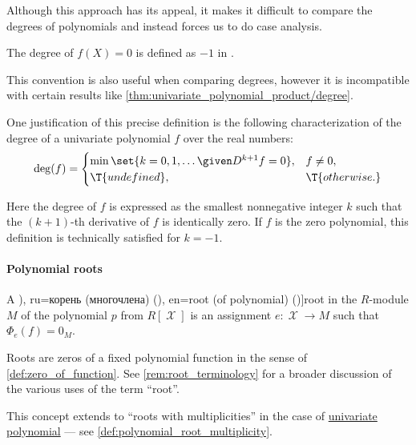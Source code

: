\begin{remark}
\begin{thmenum}
    Although this approach has its appeal, it makes it difficult to compare the degrees of polynomials and instead forces us to do case analysis.

     The degree of \( f(X) = 0 \) is defined as \( -1 \) in \cite[10]{FriedbergInselSpence2018LinearAlgebra}.

    This convention is also useful when comparing degrees, however it is incompatible with certain results like \cref{thm:univariate_polynomial_product/degree}.

    One justification of this precise definition is the following characterization of the degree of a univariate polynomial \( f \) over the real numbers:
    \begin{equation*}
      \deg(f) = \begin{cases}
        \min\set{ k = 0, 1, \ldots \given D^{k+1} f = 0 }, &f \neq 0, \\
        \T{undefined},                                     &\T{otherwise.}
      \end{cases}
    \end{equation*}

    Here the degree of \( f \) is expressed as the smallest nonnegative integer \( k \) such that the \( (k + 1) \)-th derivative of \( f \) is identically zero. If \( f \) is the zero polynomial, this definition is technically satisfied for \( k = -1 \).
  \end{thmenum}
\end{remark}

\paragraph{Polynomial roots}

\begin{definition}\label{def:polynomial_root}\mimprovised
  A \term[bg=корен (на уравнение) (\cite[2]{Обрешков1962ВисшаАлгебра}), ru=корень (многочлена) (\cite[99]{Винберг2014КурсАлгебры}), en=root (of polynomial) (\cite[281]{Aluffi2009Algebra})]{root} in the \( R \)-module \( M \) of the polynomial \( p \) from \( R[\mscrX] \) is an assignment \( e: \mscrX \to M \) such that \( \Phi_e(f) = 0_M \).
\end{definition}
\begin{comments}
  \item Roots are zeros of a fixed polynomial function in the sense of \cref{def:zero_of_function}. See \cref{rem:root_terminology} for a broader discussion of the various uses of the term \enquote{root}.

  \item This concept extends to \enquote{roots with multiplicities} in the case of \hyperref[def:univariate_polynomial]{univariate polynomial} --- see \cref{def:polynomial_root_multiplicity}.
\end{comments}

